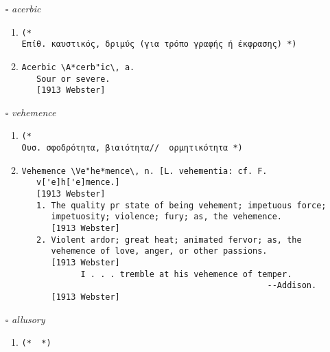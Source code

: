 \documentclass{article}
\begin{document}
\begin{itemize}
\begin{enumerate}
{\begin{lstlisting}
(* 
Επίθ. δηκτικός, δριμύς// έξυπνος, διεισδυτικός// απερίφραστος *)
\end{lstlisting}}
\item{
\begin{lstlisting}
Trenchant \Trench"ant\, a. [OF. trenchant, F. tranchant, p. pr.
   See {Trench}, v. t.]
   1. Fitted to trench or cut; gutting; sharp. `` Trenchant was
      the blade.'' --Chaucer.
      [1913 Webster]
   2. Fig.: Keen; biting; severe; as, trenchant wit.
      [1913 Webster]
\end{lstlisting}}
\end{enumerate}
\item[$\square$] \emph{ acerbic }
\begin{enumerate}
\item{
\begin{lstlisting}
(* 
Επίθ. καυστικός, δριμύς (για τρόπο γραφής ή έκφρασης) *)
\end{lstlisting}}
\item{
\begin{lstlisting}
Acerbic \A*cerb"ic\, a.
   Sour or severe.
   [1913 Webster]
\end{lstlisting}}
\end{enumerate}
\item[$\square$] \emph{ vehemence }
\begin{enumerate}
\item{
\begin{lstlisting}
(* 
Ουσ. σφοδρότητα, βιαιότητα//  ορμητικότητα *)
\end{lstlisting}}
\item{
\begin{lstlisting}
Vehemence \Ve"he*mence\, n. [L. vehementia: cf. F.
   v['e]h['e]mence.]
   [1913 Webster]
   1. The quality pr state of being vehement; impetuous force;
      impetuosity; violence; fury; as, the vehemence.
      [1913 Webster]
   2. Violent ardor; great heat; animated fervor; as, the
      vehemence of love, anger, or other passions.
      [1913 Webster]
            I . . . tremble at his vehemence of temper.
                                                  --Addison.
      [1913 Webster]
\end{lstlisting}}
\end{enumerate}
\item[$\square$] \emph{ allusory }
\begin{enumerate}
\item{
\begin{lstlisting}
(*  *)
\end{lstlisting}}

\end{enumerate}
\end{itemize}
\end{document}
